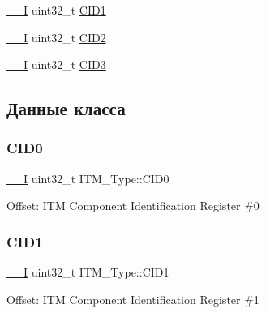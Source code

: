 \begin{DoxyCompactItemize}
\item 
\mbox{\hyperlink{group___c_m_s_i_s___c_m3__core__definitions_gaf63697ed9952cc71e1225efe205f6cd3}{\+\_\+\+\_\+I}} uint32\+\_\+t \mbox{\hyperlink{struct_i_t_m___type_a5f7d524b71f49e444ff0d1d52b3c3565}{C\+I\+D1}}
\item 
\mbox{\hyperlink{group___c_m_s_i_s___c_m3__core__definitions_gaf63697ed9952cc71e1225efe205f6cd3}{\+\_\+\+\_\+I}} uint32\+\_\+t \mbox{\hyperlink{struct_i_t_m___type_adee4ccce1429db8b5db3809c4539f876}{C\+I\+D2}}
\item 
\mbox{\hyperlink{group___c_m_s_i_s___c_m3__core__definitions_gaf63697ed9952cc71e1225efe205f6cd3}{\+\_\+\+\_\+I}} uint32\+\_\+t \mbox{\hyperlink{struct_i_t_m___type_a0e7aa199619cc7ac6baddff9600aa52e}{C\+I\+D3}}
\end{DoxyCompactItemize}


\subsection{Данные класса}
\mbox{\label{struct_i_t_m___type_a413f3bb0a15222e5f38fca4baeef14f6}} 
\subsubsection{\texorpdfstring{CID0}{CID0}}
{\footnotesize\ttfamily \mbox{\hyperlink{group___c_m_s_i_s___c_m3__core__definitions_gaf63697ed9952cc71e1225efe205f6cd3}{\+\_\+\+\_\+I}} uint32\+\_\+t I\+T\+M\+\_\+\+Type\+::\+C\+I\+D0}

Offset\+: I\+TM Component Identification Register \#0 \mbox{\label{struct_i_t_m___type_a5f7d524b71f49e444ff0d1d52b3c3565}} 
\subsubsection{\texorpdfstring{CID1}{CID1}}
{\footnotesize\ttfamily \mbox{\hyperlink{group___c_m_s_i_s___c_m3__core__definitions_gaf63697ed9952cc71e1225efe205f6cd3}{\+\_\+\+\_\+I}} uint32\+\_\+t I\+T\+M\+\_\+\+Type\+::\+C\+I\+D1}

Offset\+: I\+TM Component Identification Register \#1 \mbox{\label{struct_i_t_m___type_adee4ccce1429db8b5db3809c4539f876}} 

